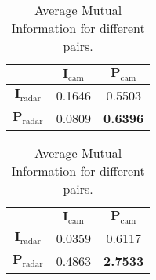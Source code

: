 
\begin{table}[h]
\renewcommand{\arraystretch}{1.2} %
\parbox{.45\linewidth}{
\centering
\begin{tabular}{|c||c c|}
\hline
    & $\mathbf{I}_{\text{cam}}$ & $\mathbf{P}_{\text{cam}}$ \\ \hline\hline
$\mathbf{I}_{\text{radar}}$ & 0.1646 & 0.5503 \\
$\mathbf{P}_{\text{radar}}$ & 0.0809 & \textbf{0.6396} \\ \hline
\end{tabular}
\caption{Average Pearson Correlation for different pairs.}
\label{tab:Correlation}
}
\hfill
\parbox{.45\linewidth}{
\centering
\begin{tabular}{|c||c c|}
\hline
    & $\mathbf{I}_{\text{cam}}$ & $\mathbf{P}_{\text{cam}}$ \\ \hline\hline
$\mathbf{I}_{\text{radar}}$ & 0.0359 & 0.6117 \\ 
$\mathbf{P}_{\text{radar}}$ & 0.4863 & \textbf{2.7533} \\ \hline
\end{tabular}
\caption{Average Mutual Information for different pairs.}
\label{tab:Mutual_Information}
}
\vspace{-10pt} %
\end{table}




